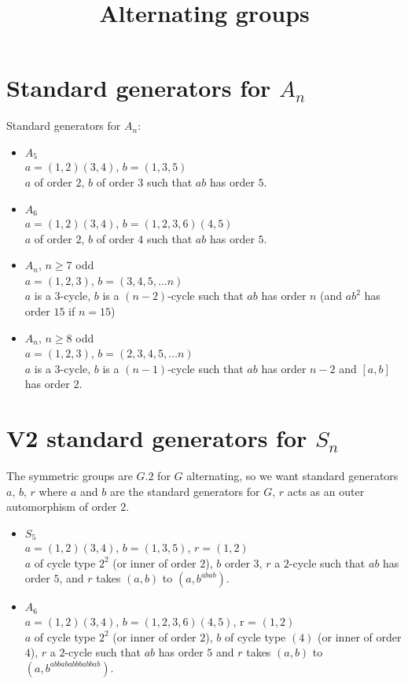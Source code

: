 \documentclass{article}
\title{Alternating groups}
\begin{document}
\maketitle

\section{Standard generators for $A_n$}

Standard generators for $A_n$:

\begin{itemize}
\item $A_5$ \\
$a = (1,2)(3,4)$, $b = (1,3,5)$ \\
$a$ of order $2$, $b$ of order $3$ such that $ab$ has order $5$.
\item $A_6$ \\
$a = (1,2)(3,4)$, $b = (1, 2, 3, 6)(4, 5)$ \\
$a$ of order $2$, $b$ of order $4$ such that $ab$ has order $5$.
\item $A_n$, $n \geq 7$ odd \\
$a = (1, 2, 3)$, $b = (3, 4, 5, \ldots n)$ \\
$a$ is a $3$-cycle, $b$ is a $(n-2)$-cycle such that $ab$ has order $n$ (and $ab^2$ has order $15$ if $n = 15$)
\item $A_n$, $n \geq 8$ odd \\
$a = (1, 2, 3)$, $b = (2, 3, 4, 5, \ldots n)$ \\
$a$ is a $3$-cycle, $b$ is a $(n-1)$-cycle such that $ab$ has order $n-2$ and $[a,b]$ has order $2$.
\end{itemize}


\section{V2 standard generators for $S_n$}

The symmetric groups are $G.2$ for $G$ alternating, so we want standard
generators $a$, $b$, $r$ where $a$ and $b$ are the standard generators for $G$, $r$ acts
as an outer automorphism of order $2$.



\begin{itemize}
\item $S_5$ \\
$a = (1,2)(3,4)$, $b = (1,3,5)$, $r = (1,2)$ \\
$a$ of cycle type $2^2$ (or inner of order $2$), $b$ order $3$, $r$ a $2$-cycle such that $ab$ has order $5$, and $r$ takes $(a,b)$ to $(a,b^{abab})$. \\
\item $A_6$ \\
$a = (1,2)(3,4)$, $b = (1, 2, 3, 6)(4, 5)$, r = $(1, 2)$ \\
$a$ of cycle type $2^2$ (or inner of order $2$), $b$ of cycle type $(4)$ (or inner of order $4$), $r$ a $2$-cycle such that $ab$ has order $5$
and $r$ takes $(a,b)$ to $(a, b^{abbababbbabbab})$.
\end{itemize}
\end{document}
